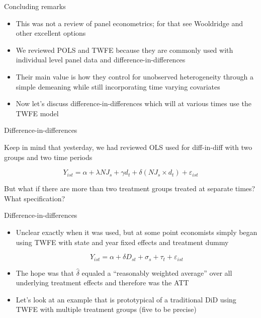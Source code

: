 \documentclass{beamer}
\begin{document}
\begin{frame}{Concluding remarks}

\begin{itemize}
\item This was not a review of panel econometrics; for that see Wooldridge and other excellent options
\item We reviewed POLS and TWFE because they are commonly used with individual level panel data and difference-in-differences
\item Their main value is how they control for unobserved heterogeneity through a simple demeaning while still incorporating time varying covariates
\item Now let's discuss difference-in-differences which will at various times use the TWFE model
\end{itemize}

\end{frame}

\begin{frame}{Difference-in-differences}

Keep in mind that yesterday, we had reviewed OLS used for diff-in-diff with two groups and two time periods

$$Y_{ist} = \alpha + \lambda NJ_s + \gamma d_t + \delta (NJ_s \times d_t) + \varepsilon_{ist}$$

\bigskip

But what if there are more than two treatment groups treated at separate times?  What specification?

\end{frame}



\begin{frame}{Difference-in-differences}

\begin{itemize}
\item Unclear exactly when it was used, but at some point economists simply began using TWFE with state and year fixed effects and treatment dummy

$$ Y_{ist} = \alpha + \delta D_{st} + \sigma_s + \tau_t + \varepsilon_{ist}$$

\item The hope was that $\widehat{\delta}$ equaled a ``reasonably weighted average'' over all underlying treatment effects and therefore was the ATT
\item Let's look at an example that is prototypical of a traditional DiD using TWFE with multiple treatment groups (five to be precise)
\end{itemize}

\end{frame}
\end{document}
